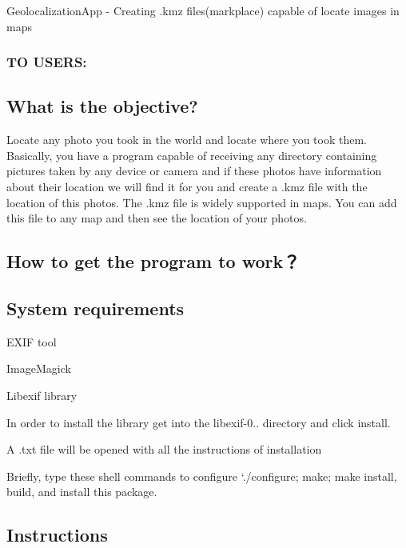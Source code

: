 Geolocalization\+App -\/ Creating .kmz files(markplace) capable of locate images in maps 

\subsubsection*{TO U\+S\+E\+RS\+:}

\subsection*{What is the objective?}

Locate any photo you took in the world and locate where you took them. Basically, you have a program capable of receiving any directory containing pictures taken by any device or camera and if these photos have information about their location we will find it for you and create a .kmz file with the location of this photos. The .kmz file is widely supported in maps. You can add this file to any map and then see the location of your photos.

\subsection*{How to get the program to work？}

\subsection*{System requirements}

E\+X\+IF tool

Image\+Magick

Libexif library


\begin{DoxyEnumerate}
\item In order to install the library get into the libexif-\/0.. directory and click install. 
\item A .txt file will be opened with all the instructions of installation 
\item Briefly, type these shell commands to configure `./configure; make; make install\textquotesingle{}, build, and install this package. 
\end{DoxyEnumerate}

\subsection*{Instructions}


